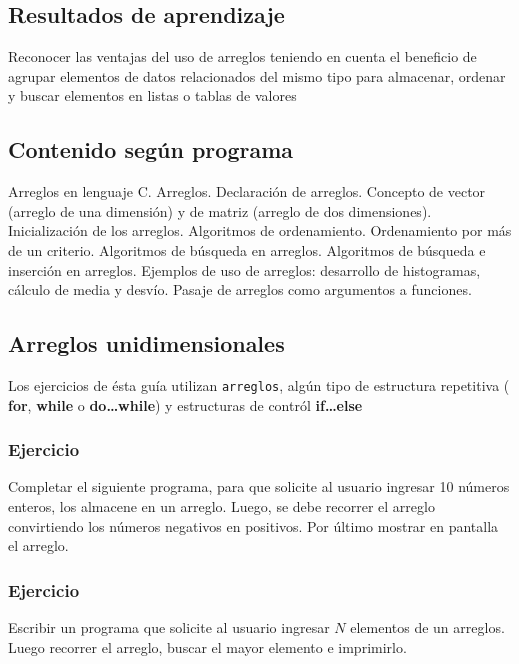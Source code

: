 \subsection*{Resultados de aprendizaje}
Reconocer las ventajas del uso de arreglos teniendo en cuenta el beneficio de agrupar elementos de datos relacionados del mismo tipo para almacenar, ordenar y buscar elementos en listas o tablas de valores

\subsection*{Contenido según programa}
Arreglos en lenguaje C. Arreglos. Declaración de arreglos. Concepto de vector (arreglo de una dimensión) y de matriz (arreglo de dos dimensiones). Inicialización de los arreglos. Algoritmos de ordenamiento.  Ordenamiento por más de un criterio. Algoritmos de búsqueda en arreglos.  Algoritmos de búsqueda e inserción en arreglos.  Ejemplos de uso de arreglos: desarrollo de histogramas, cálculo de media y desvío. Pasaje de arreglos como argumentos a funciones.

\setcounter{subsection}{7}
\subsection*{Arreglos unidimensionales}

Los ejercicios de ésta guía utilizan \texttt{arreglos}, algún tipo de estructura repetitiva ( \textbf{for}, \textbf{while} o \textbf{do\dots while})
y estructuras de contról \textbf{if\dots else}

\subsubsection{Ejercicio}
Completar el siguiente programa, para que solicite al usuario ingresar 10 números enteros, los almacene en un arreglo. Luego, se debe recorrer el arreglo convirtiendo los números negativos en positivos. Por último mostrar en pantalla el arreglo.
\lstset{inputencoding=utf8/latin1}

{\small
  \lstset{inputencoding=utf8/latin1}
  
}

\subsubsection{Ejercicio}
Escribir un programa que solicite al usuario ingresar $N$ elementos de un arreglos. Luego recorrer el arreglo, buscar el mayor elemento e imprimirlo.
{\small
  \lstset{inputencoding=utf8/latin1}
  
}

